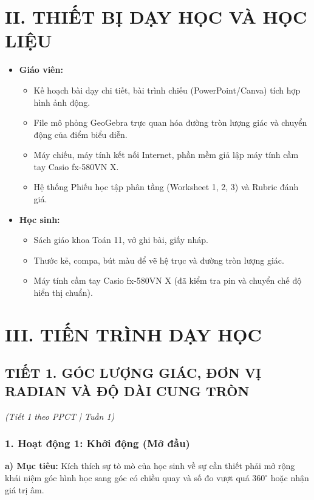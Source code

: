 \documentclass[12pt, a4paper]{article}
\begin{document}
\section*{II. THIẾT BỊ DẠY HỌC VÀ HỌC LIỆU}

\begin{itemize}[leftmargin=1.2cm]
    \item \textbf{Giáo viên:}
    \begin{itemize}[leftmargin=0.6cm]
        \item Kế hoạch bài dạy chi tiết, bài trình chiếu (PowerPoint/Canva) tích hợp hình ảnh động.
        \item File mô phỏng GeoGebra trực quan hóa đường tròn lượng giác và chuyển động của điểm biểu diễn.
        \item Máy chiếu, máy tính kết nối Internet, phần mềm giả lập máy tính cầm tay Casio fx-580VN X.
        \item Hệ thống Phiếu học tập phân tầng (Worksheet 1, 2, 3) và Rubric đánh giá.
    \end{itemize}
    \item \textbf{Học sinh:}
    \begin{itemize}[leftmargin=0.6cm]
        \item Sách giáo khoa Toán 11, vở ghi bài, giấy nháp.
        \item Thước kẻ, compa, bút màu để vẽ hệ trục và đường tròn lượng giác.
        \item Máy tính cầm tay Casio fx-580VN X (đã kiểm tra pin và chuyển chế độ hiển thị chuẩn).
    \end{itemize}
\end{itemize}

\section*{III. TIẾN TRÌNH DẠY HỌC}

\subsection*{TIẾT 1. GÓC LƯỢNG GIÁC, ĐƠN VỊ RADIAN VÀ ĐỘ DÀI CUNG TRÒN}
\textit{(Tiết 1 theo PPCT | Tuần 1)}

\subsubsection*{1. Hoạt động 1: Khởi động (Mở đầu)}
\textbf{a) Mục tiêu:} Kích thích sự tò mò của học sinh về sự cần thiết phải mở rộng khái niệm góc hình học sang góc có chiều quay và số đo vượt quá $360^\circ$ hoặc nhận giá trị âm.
\end{document}
